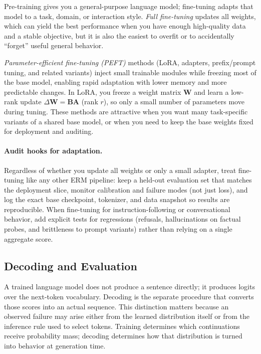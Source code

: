 Pre-training gives you a general-purpose language model; fine-tuning adapts that model to a task, domain, or interaction style. \emph{Full fine-tuning} updates all weights, which can yield the best performance when you have enough high-quality data and a stable objective, but it is also the easiest to overfit or to accidentally ``forget'' useful general behavior.

\emph{Parameter-efficient fine-tuning (PEFT)} methods (LoRA, adapters, prefix/prompt tuning, and related variants) inject small trainable modules while freezing most of the base model, enabling rapid adaptation with lower memory and more predictable changes. In LoRA, you freeze a weight matrix \(\mathbf{W}\) and learn a low-rank update \(\Delta \mathbf{W}=\mathbf{B}\mathbf{A}\) (rank \(r\)), so only a small number of parameters move during tuning. These methods are attractive when you want many task-specific variants of a shared base model, or when you need to keep the base weights fixed for deployment and auditing.

\paragraph{Audit hooks for adaptation.}
Regardless of whether you update all weights or only a small adapter, treat fine-tuning like any other ERM pipeline: keep a held-out evaluation set that matches the deployment slice, monitor calibration and failure modes (not just loss), and log the exact base checkpoint, tokenizer, and data snapshot so results are reproducible. When fine-tuning for instruction-following or conversational behavior, add explicit tests for regressions (refusals, hallucinations on factual probes, and brittleness to prompt variants) rather than relying on a single aggregate score.

\subsection{Decoding and Evaluation}
\label{sec:transformers_decoding_and_evaluation}
A trained language model does not produce a sentence directly; it produces logits over the next-token vocabulary. Decoding is the separate procedure that converts those scores into an actual sequence. This distinction matters because an observed failure may arise either from the learned distribution itself or from the inference rule used to select tokens. Training determines which continuations receive probability mass; decoding determines how that distribution is turned into behavior at generation time.

